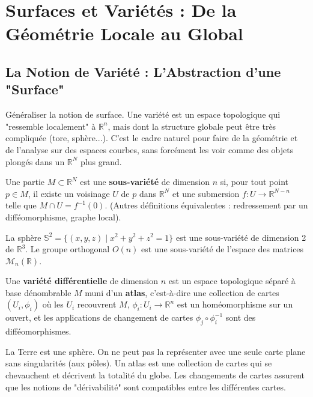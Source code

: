 \chapter{Surfaces et Variétés : De la Géométrie Locale au Global}

\section{La Notion de Variété : L'Abstraction d'une "Surface"}

\begin{objectif}
    Généraliser la notion de surface. Une variété est un espace topologique qui "ressemble localement" à $\mathbb{R}^n$, mais dont la structure globale peut être très compliquée (tore, sphère...). C'est le cadre naturel pour faire de la géométrie et de l'analyse sur des espaces courbes, sans forcément les voir comme des objets plongés dans un $\mathbb{R}^N$ plus grand.
\end{objectif}

\begin{definition}
    Une partie $M \subset \mathbb{R}^N$ est une \textbf{sous-variété} de dimension $n$ si, pour tout point $p \in M$, il existe un voisinage $U$ de $p$ dans $\mathbb{R}^N$ et une submersion $f: U \to \mathbb{R}^{N-n}$ telle que $M \cap U = f^{-1}(0)$.
    (Autres définitions équivalentes : redressement par un difféomorphisme, graphe local).
\end{definition}

\begin{example}
    La sphère $\mathbb{S}^2 = \{(x,y,z) \mid x^2+y^2+z^2=1\}$ est une sous-variété de dimension 2 de $\mathbb{R}^3$. Le groupe orthogonal $O(n)$ est une sous-variété de l'espace des matrices $\mathcal{M}_n(\mathbb{R})$.
\end{example}

\begin{definition}
    Une \textbf{variété différentielle} de dimension $n$ est un espace topologique séparé à base dénombrable $M$ muni d'un \textbf{atlas}, c'est-à-dire une collection de cartes $(U_i, \phi_i)$ où les $U_i$ recouvrent $M$, $\phi_i: U_i \to \mathbb{R}^n$ est un homéomorphisme sur un ouvert, et les applications de changement de cartes $\phi_j \circ \phi_i^{-1}$ sont des difféomorphismes.
\end{definition}
\begin{remark}
    La Terre est une sphère. On ne peut pas la représenter avec une seule carte plane sans singularités (aux pôles). Un atlas est une collection de cartes qui se chevauchent et décrivent la totalité du globe. Les changements de cartes assurent que les notions de "dérivabilité" sont compatibles entre les différentes cartes.
\end{remark}

